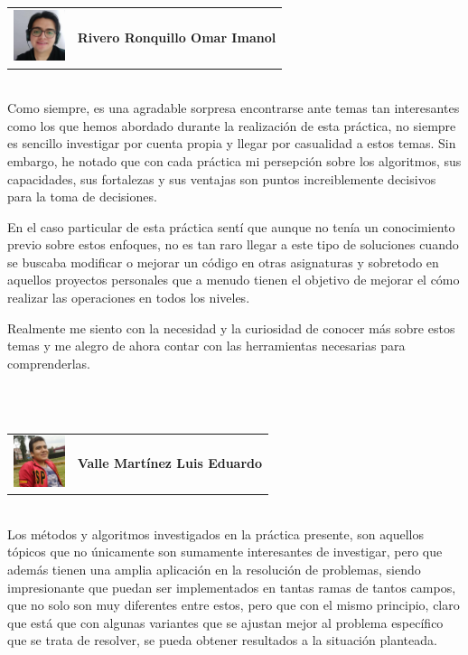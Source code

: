 \begin{tabular}{l l}
        \multirow{3}{*}{\includegraphics[width=1.5cm]{Imagenes/imanol.jpg}} &  \\
        & \textbf{Rivero Ronquillo Omar Imanol}\\
        & \\
    \end{tabular}
    \vspace*{3\baselineskip}\\
    Como siempre, es una agradable sorpresa encontrarse ante temas tan interesantes como los que hemos abordado durante la realización de esta práctica, no siempre es sencillo investigar por cuenta propia y llegar por casualidad a estos temas. Sin embargo, he notado que con cada práctica mi persepción sobre los algoritmos, sus capacidades, sus fortalezas y sus ventajas son puntos increiblemente decisivos para la toma de decisiones.
    
    En el caso particular de esta práctica sentí que aunque no tenía un conocimiento previo sobre estos enfoques, no es tan raro llegar a este tipo de soluciones cuando se buscaba modificar o mejorar un código en otras asignaturas y sobretodo en aquellos proyectos personales que a menudo tienen el objetivo de mejorar el cómo realizar las operaciones en todos los niveles.
    
    Realmente me siento con la necesidad y la curiosidad de conocer más sobre estos temas y me alegro de ahora contar con las herramientas necesarias para comprenderlas.
    
    \\\\
    \begin{tabular}{l l}
        \multirow{3}{*}{\includegraphics[width=1.5cm]{Imagenes/lalo.jpg}}  &  \\
        & \textbf{Valle Mart\'inez Luis Eduardo} \\
        & \\
    \end{tabular}
    \vspace*{3\baselineskip}\\
    Los métodos y algoritmos investigados en la práctica presente, son aquellos tópicos que no únicamente son sumamente interesantes de investigar, pero que además tienen una amplia aplicación en la resolución de problemas, siendo impresionante que puedan ser implementados en tantas ramas de tantos campos, que no solo son muy diferentes entre estos, pero que con el mismo principio, claro que está que con algunas variantes que se ajustan mejor al problema específico que se trata de resolver, se pueda obtener resultados a la situación planteada.
    
